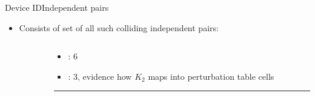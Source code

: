 \documentclass[aspectratio=169, hyperref={colorlinks=true, allcolors=SecondaryColor}, c]{beamer}
\begin{document}
	\begin{frame}[fragile]{Device ID}{Independent pairs}
		\begin{itemize}
			\item Consists of set of all such colliding \alert{independent} pairs:
		\end{itemize}
		\vspace{0.5cm}
		\begin{columns}
			\begin{column}{0.6\textwidth}
				\begin{adjustbox}{max width=\textwidth}
				\end{adjustbox}
			\end{column}
			\begin{column}{0.4\textwidth}
				\begin{itemize}
					\item {}: 6
					\item {}: 3, evidence how $K_2$ maps into \alert{perturbation table} cells%
				\end{itemize}

				\begin{center}
					\vspace{-0.1cm}
					\color{PrimaryColor}\rule{0.9\textwidth}{0.25mm}
				\end{center}


\end{column}
\end{columns}
\end{frame}
\end{document}
